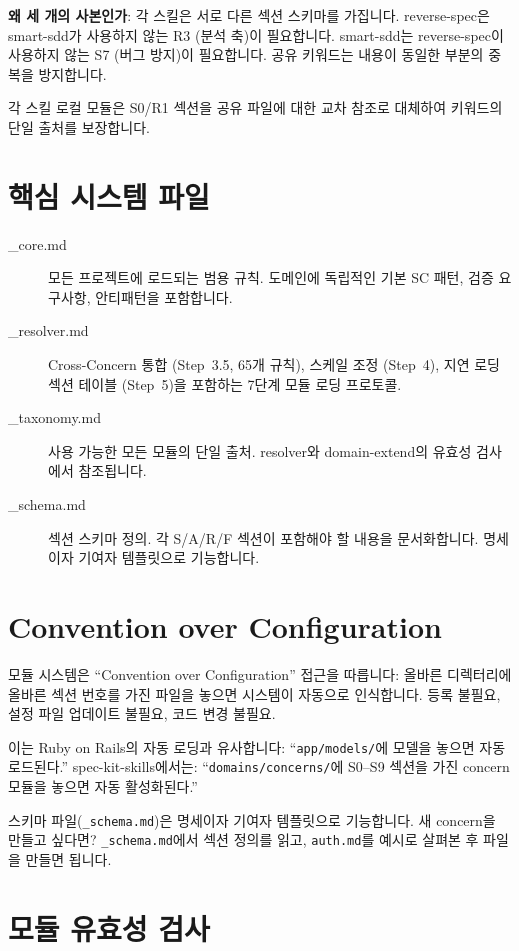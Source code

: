 \documentclass[11pt,a4paper,openright,twoside]{report}
\newcommand{\file}[1]{\texttt{#1}}
\begin{document}
\textbf{왜 세 개의 사본인가}: 각 스킬은 서로 다른 섹션 스키마를 가집니다. reverse-spec은 smart-sdd가 사용하지 않는 R3 (분석 축)이 필요합니다. smart-sdd는 reverse-spec이 사용하지 않는 S7 (버그 방지)이 필요합니다. 공유 키워드는 내용이 동일한 부분의 중복을 방지합니다.

각 스킬 로컬 모듈은 S0/R1 섹션을 공유 파일에 대한 교차 참조로 대체하여 키워드의 단일 출처를 보장합니다.

\section{핵심 시스템 파일}

\begin{description}
  \item[\_core.md] 모든 프로젝트에 로드되는 범용 규칙. 도메인에 독립적인 기본 SC 패턴, 검증 요구사항, 안티패턴을 포함합니다.
  \item[\_resolver.md] Cross-Concern 통합 (Step~3.5, 65개 규칙), 스케일 조정 (Step~4), 지연 로딩 섹션 테이블 (Step~5)을 포함하는 7단계 모듈 로딩 프로토콜.
  \item[\_taxonomy.md] 사용 가능한 모든 모듈의 단일 출처. resolver와 domain-extend의 유효성 검사에서 참조됩니다.
  \item[\_schema.md] 섹션 스키마 정의. 각 S/A/R/F 섹션이 포함해야 할 내용을 문서화합니다. 명세이자 기여자 템플릿으로 기능합니다.
\end{description}


\section{Convention over Configuration}

모듈 시스템은 ``Convention over Configuration'' 접근을 따릅니다: 올바른 디렉터리에 올바른 섹션 번호를 가진 파일을 놓으면 시스템이 자동으로 인식합니다. 등록 불필요, 설정 파일 업데이트 불필요, 코드 변경 불필요.

이는 Ruby on Rails의 자동 로딩과 유사합니다: ``\file{app/models/}에 모델을 놓으면 자동 로드된다.'' spec-kit-skills에서는: ``\file{domains/concerns/}에 S0--S9 섹션을 가진 concern 모듈을 놓으면 자동 활성화된다.''

스키마 파일(\file{\_schema.md})은 명세이자 기여자 템플릿으로 기능합니다. 새 concern을 만들고 싶다면? \file{\_schema.md}에서 섹션 정의를 읽고, \file{auth.md}를 예시로 살펴본 후 파일을 만들면 됩니다.

\section{모듈 유효성 검사}
\end{document}
